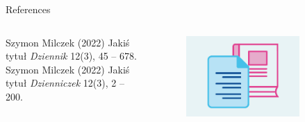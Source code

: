 \documentclass[aspectratio=169,xcolor=dvipsnames]{beamer}
\begin{document}
\begin{frame}{References}
    \begin{columns}
    
        \footnotesize{
            \begin{thebibliography}{99}
                 Szymon Milczek (2022)
                \newblock Jakiś tytuł
                \newblock \emph{Dziennik} 12(3), 45 -- 678.
                 Szymon Milczek (2022)
                \newblock Jakiś tytuł
                \newblock \emph{Dzienniczek} 12(3), 2 -- 200.
            \end{thebibliography}
        }
        
        \begin{figure}
            \centering
            \includegraphics[width=0.8\textwidth]{ref.png}
        \end{figure}
    \end{columns}
\end{frame}

\end{document}
